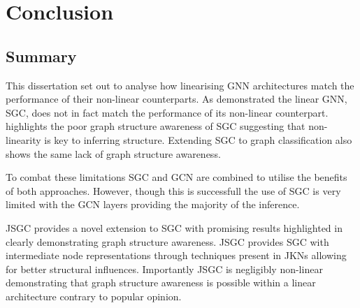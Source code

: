 \chapter{Conclusion}

\section{Summary}
This dissertation set out to analyse how linearising GNN architectures match the performance of their non-linear counterparts.
As  demonstrated the linear GNN, SGC, does not in fact match the performance of its non-linear counterpart.
 highlights the poor graph structure awareness of SGC suggesting that non-linearity is key to inferring structure.
Extending SGC to graph classification also shows the same lack of graph structure awareness.

To combat these limitations SGC and GCN are combined to utilise the benefits of both approaches.
However, though this is successfull the use of SGC is very limited with the GCN layers providing the majority of the inference.

JSGC provides a novel extension to SGC with promising results highlighted in  clearly demonstrating graph structure awareness.
JSGC provides SGC with intermediate node representations through techniques present in JKNs\cite{xu2018representation} allowing for better structural influences.
Importantly JSGC is negligibly non-linear demonstrating that graph structure awareness is possible within a linear architecture contrary to popular opinion.

